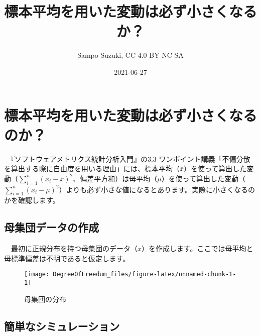 \documentclass[]{tufte-handout}
\title[標本平均を用いた変動は必ず小さくなるのか？]{標本平均を用いた変動は必ず小さくなるか？}
\author{Sampo Suzuki, CC 4.0 BY-NC-SA}
\date{2021-06-27}
\begin{document}
\maketitle




\hypertarget{ux6a19ux672cux5e73ux5747ux3092ux7528ux3044ux305fux5909ux52d5ux306fux5fc5ux305aux5c0fux3055ux304fux306aux308bux306eux304b}{%
\section{\texorpdfstring{\textbf{標本平均を用いた変動は必ず小さくなるのか？}}{標本平均を用いた変動は必ず小さくなるのか？}}\label{ux6a19ux672cux5e73ux5747ux3092ux7528ux3044ux305fux5909ux52d5ux306fux5fc5ux305aux5c0fux3055ux304fux306aux308bux306eux304b}}

　『ソフトウェアメトリクス統計分析入門』\citep{SoftwareMetrics:jbook}の3.3
ワンポイント講義「不偏分散を算出する際に自由度を用いる理由」には、標本平均（\(\bar{x}\)）を使って算出した変動（\(\sum_{i = 1}^{n}(x_i - \bar{x})^2\)、偏差平方和）は母平均（\(\mu\)）を使って算出した変動（\(\sum_{i = 1}^{n}(x_i - \mu)^2\)）よりも必ず小さな値になるとあります。実際に小さくなるのかを確認します。

\hypertarget{ux6bcdux96c6ux56e3ux30c7ux30fcux30bfux306eux4f5cux6210}{%
\subsection{\texorpdfstring{\textbf{母集団データの作成}}{母集団データの作成}}\label{ux6bcdux96c6ux56e3ux30c7ux30fcux30bfux306eux4f5cux6210}}

　最初に正規分布を持つ母集団のデータ（\(x\)）を作成します。ここでは母平均と母標準偏差は不明であると仮定します。

\begin{figure}

{\centering \texttt{[image: DegreeOfFreedum\_files/figure-latex/unnamed-chunk-1-1]} 

}

\caption[母集団の分布]{母集団の分布}\label{fig:unnamed-chunk-1}
\end{figure}

\newpage

\hypertarget{ux7c21ux5358ux306aux30b7ux30dfux30e5ux30ecux30fcux30b7ux30e7ux30f3}{%
\subsection{\texorpdfstring{\textbf{簡単なシミュレーション}}{簡単なシミュレーション}}\label{ux7c21ux5358ux306aux30b7ux30dfux30e5ux30ecux30fcux30b7ux30e7ux30f3}}
\end{document}
